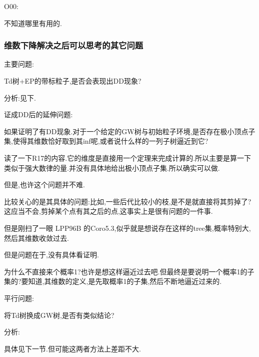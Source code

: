 \documentclass[a4paper,oneside]{ctexbook}
\begin{document}
				O00:

					不知道哪里有用的.
			
			\subsubsection*{维数下降解决之后可以思考的其它问题}

				主要问题:

					\begin{que}

						Td树+EP的带标粒子,是否会表现出DD现象?
					
					\end{que}

					分析:见下.					

				证成DD后的延伸问题:

					\begin{que}

						如果证明了有DD现象.对于一个给定的GW树与初始粒子环境,是否存在极小顶点子集,使得其维数恰好取到其inf呢,或者说什么样的一列子树逼近到它?
					
					\end{que}

						读了一下R17的内容.它的维度是直接用一个定理来完成计算的.所以主要是算一下类似于强大数律的量.并没有具体地给出极小顶点子集.所以确实可以做.

						但是,也许这个问题并不难.

						比较关心的是其具体的问题:比如,一些后代比较小的枝,是不是就直接将其剪掉了?这应当不会,剪掉某个点有其之后的点,这事实上是很有问题的一件事.

						但是刚扫了一眼 LPP96B 的Coro5.3,似乎就是想说存在这样的tree集,概率特别大,然后其维数收敛过去.

							但是问题在于,没有具体看证明.

							为什么不直接来个概率1?也许是想这样逼近过去吧.但最终是要说明一个概率1的子集的?要知道,其维数的定义,是先取概率1的子集,然后不断地逼近过来的.	

				平行问题:

					\begin{que}

						将Td树换成GW树,是否有类似结论?
					
					\end{que}

					分析:

						具体见下一节.但可能这两者方法上差距不大.
\end{document}
